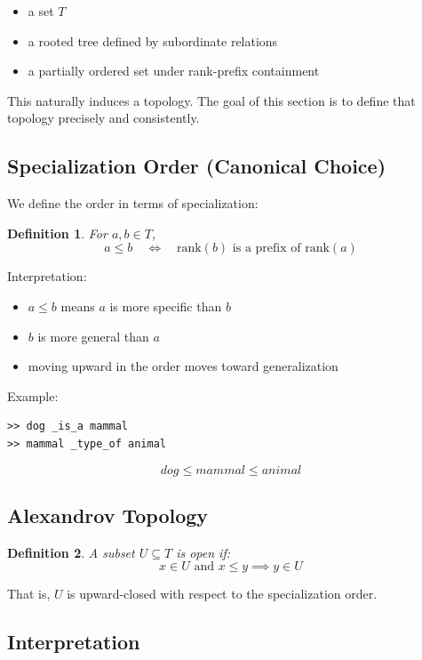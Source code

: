 \documentclass{article}
\newtheorem{definition}{Definition}[section]
\begin{document}
\begin{itemize}
    \item a set $T$
    \item a rooted tree defined by subordinate relations
    \item a partially ordered set under rank-prefix containment
\end{itemize}

This naturally induces a topology. The goal of this section is to define
that topology precisely and consistently.

\subsection{Specialization Order (Canonical Choice)}

We define the order in terms of specialization:

\begin{definition}
For $a,b \in T$,
\[
a \leq b \quad \Longleftrightarrow \quad \mathrm{rank}(b)
\text{ is a prefix of } \mathrm{rank}(a)
\]
\end{definition}

Interpretation:

\begin{itemize}
    \item $a \leq b$ means $a$ is more specific than $b$
    \item $b$ is more general than $a$
    \item moving upward in the order moves toward generalization
\end{itemize}

Example:

\begin{verbatim}
>> dog _is_a mammal
>> mammal _type_of animal
\end{verbatim}

\[
dog \leq mammal \leq animal
\]

\subsection{Alexandrov Topology}

\begin{definition}
A subset $U \subseteq T$ is open if:
\[
x \in U \text{ and } x \leq y \implies y \in U
\]
\end{definition}

That is, $U$ is upward-closed with respect to the specialization order.

\subsection{Interpretation}
\end{document}
